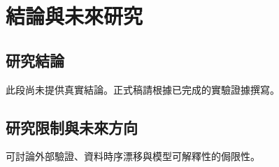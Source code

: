 \chapter{結論與未來研究}
\section{研究結論}
此段尚未提供真實結論。正式稿請根據已完成的實驗證據撰寫。
\section{研究限制與未來方向}
可討論外部驗證、資料時序漂移與模型可解釋性的侷限性。

